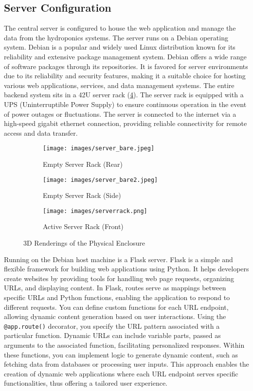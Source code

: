 \documentclass[12pt]{article} %
\begin{document}
\subsection{Server Configuration}
\noindent The central server is configured to house the web application and manage the data 
from the hydroponics systems. The server runs on a Debian operating system. Debian is a popular and widely used Linux distribution known for its reliability and extensive package management system. Debian offers a wide range of software packages through its repositories. It is favored for server environments due to its reliability and security features, making it a suitable choice for hosting various web applications, services, and data management systems. The entire backend system sits in a 42U server rack (\ref{fig:serverrack}). The server rack is equipped with a UPS (Uninterruptible Power Supply) to ensure continuous operation in the event of power outages or fluctuations. The server is connected to the internet via a high-speed gigabit ethernet connection, providing reliable connectivity for remote access and data transfer.
\begin{figure}[H]
    \centering
    \begin{subfigure}[b]{0.25\textwidth}
        \centering
        \texttt{[image: images/server\_bare.jpeg]}
        \caption{Empty Server Rack (Rear)}
        \label{fig:emptyrackrear}
    \end{subfigure}
    \hfill
    \begin{subfigure}[b]{0.25\textwidth}
        \centering
        \texttt{[image: images/server\_bare2.jpeg]}
        \caption{Empty Server Rack (Side)}
        \label{fig:emptyrackside}
    \end{subfigure}
    \hfill
    \begin{subfigure}[b]{0.25\textwidth}
        \centering
        \texttt{[image: images/serverrack.png]}
        \caption{Active Server Rack (Front)}
        \label{fig:activerack}
    \end{subfigure}
    \caption{3D Renderings of the Physical Enclosure}
    \label{fig:serverrack}
\end{figure}
\noindent Running on the Debian host machine is a Flask server. Flask is a simple and flexible framework for building web applications using Python. It helps developers create websites by providing tools for handling web page requests, organizing URLs, and displaying content. In Flask, routes serve as mappings between specific URLs and Python functions, enabling the application to respond to different requests. You can define custom functions for each URL endpoint, allowing dynamic content generation based on user interactions. Using the \verb|@app.route()| decorator, you specify the URL pattern associated with a particular function. Dynamic URLs can include variable parts, passed as arguments to the associated function, facilitating personalized responses. Within these functions, you can implement logic to generate dynamic content, such as fetching data from databases or processing user inputs. This approach enables the creation of dynamic web applications where each URL endpoint serves specific functionalities, thus offering a tailored user experience.
\end{document}
